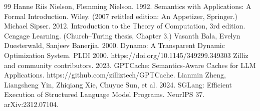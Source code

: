 \documentclass[
  sigconf,
  anonymous]{acmart}
\begin{document}
{\begin{thebibliography}{99}
 Hanne Riis Nielson, Flemming Nielson. 1992. Semantics with Applications: A Formal Introduction. Wiley. (2007 retitled edition: An Appetizer, Springer.)
 Michael Sipser. 2012. Introduction to the Theory of Computation, 3rd edition. Cengage Learning. (Church–Turing thesis, Chapter 3.)
 Vasanth Bala, Evelyn Duesterwald, Sanjeev Banerjia. 2000. Dynamo: A Transparent Dynamic Optimization System. PLDI 2000. https://doi.org/10.1145/349299.349303
 Zilliz and community contributors. 2023. GPTCache: Semantics-Aware Caches for LLM Applications. https://github.com/zilliztech/GPTCache.
 Lianmin Zheng, Liangsheng Yin, Zhiqiang Xie, Chuyue Sun, et al. 2024. SGLang: Efficient Execution of Structured Language Model Programs. NeurIPS 37. arXiv:2312.07104.
\end{thebibliography}}
\end{document}
